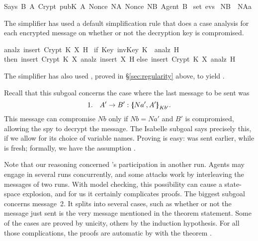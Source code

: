 \begin{isabellebody}
\begin{isamarkuptxt}
\begin{isabelle}
Says\ B\ A\ {\isacharparenleft}Crypt\ {\isacharparenleft}pubK\ A{\isacharparenright}\ {\isasymlbrace}Nonce\ NA{\isacharcomma}\ Nonce\ NB{\isacharcomma}\ Agent\ B{\isasymrbrace}{\isacharparenright}\isanewline
{}\ set\ evs{}\ {\isasymlongrightarrow}\isanewline
{}NB\ {\isasymnoteq}\ NAa%
\end{isabelle}
The simplifier has used a 
default simplification rule that does a case
analysis for each encrypted message on whether or not the decryption key
is compromised.
\begin{isabelle}%
analz\ {\isacharparenleft}insert\ {\isacharparenleft}Crypt\ K\ X{\isacharparenright}\ H{\isacharparenright}\ {\isacharequal}\isanewline
{\isacharparenleft}if\ Key\ {\isacharparenleft}invKey\ K{\isacharparenright}\ {\isasymin}\ analz\ H\isanewline
\isaindent{{\isacharparenleft}}then\ insert\ {\isacharparenleft}Crypt\ K\ X{\isacharparenright}\ {\isacharparenleft}analz\ {\isacharparenleft}insert\ X\ H{\isacharparenright}{\isacharparenright}\isanewline
\isaindent{{\isacharparenleft}}else\ insert\ {\isacharparenleft}Crypt\ K\ X{\isacharparenright}\ {\isacharparenleft}analz\ H{\isacharparenright}{\isacharparenright}%
\end{isabelle}
The simplifier has also used , proved in
{\S}\ref{sec:regularity} above, to yield .

Recall that this subgoal concerns the case
where the last message to be sent was
\[ 1.\quad  A'\to B'  : \mathopen{\{\kern-.30em|} Na',A'\mathclose{|\kern-.32em\}}\sb{Kb'}. \]
This message can compromise $Nb$ only if $Nb=Na'$ and $B'$ is compromised,
allowing the spy to decrypt the message.  The Isabelle subgoal says
precisely this, if we allow for its choice of variable names.
Proving  is easy:  was
sent earlier, while  is fresh; formally, we have
the assumption . 

Note that our reasoning concerned 's participation in another
run.  Agents may engage in several runs concurrently, and some attacks work
by interleaving the messages of two runs.  With model checking, this
possibility can cause a state-space explosion, and for us it
certainly complicates proofs.  The biggest subgoal concerns message~2.  It
splits into several cases, such as whether or not the message just sent is
the very message mentioned in the theorem statement.
Some of the cases are proved by unicity, others by
the induction hypothesis.  For all those complications, the proofs are
automatic by  with the theorem .


\end{isamarkuptxt}
\end{isabellebody}

